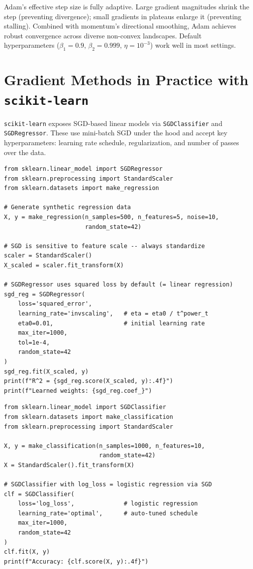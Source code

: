 \begin{remark}
Adam's effective step size is fully adaptive. Large gradient magnitudes shrink the step (preventing divergence); small gradients in plateaus enlarge it (preventing stalling). Combined with momentum's directional smoothing, Adam achieves robust convergence across diverse non-convex landscapes. Default hyperparameters ($\beta_1 = 0.9$, $\beta_2 = 0.999$, $\eta = 10^{-3}$) work well in most settings.
\end{remark}

\section*{Gradient Methods in Practice with \texttt{scikit-learn}}

\texttt{scikit-learn} exposes SGD-based linear models via \texttt{SGDClassifier} and \texttt{SGDRegressor}. These use mini-batch SGD under the hood and accept key hyperparameters: learning rate schedule, regularization, and number of passes over the data.

\begin{lstlisting}[style=pythonstyle]
from sklearn.linear_model import SGDRegressor
from sklearn.preprocessing import StandardScaler
from sklearn.datasets import make_regression

# Generate synthetic regression data
X, y = make_regression(n_samples=500, n_features=5, noise=10,
                       random_state=42)

# SGD is sensitive to feature scale -- always standardize
scaler = StandardScaler()
X_scaled = scaler.fit_transform(X)

# SGDRegressor uses squared loss by default (= linear regression)
sgd_reg = SGDRegressor(
    loss='squared_error',
    learning_rate='invscaling',   # eta = eta0 / t^power_t
    eta0=0.01,                    # initial learning rate
    max_iter=1000,
    tol=1e-4,
    random_state=42
)
sgd_reg.fit(X_scaled, y)
print(f"R^2 = {sgd_reg.score(X_scaled, y):.4f}")
print(f"Learned weights: {sgd_reg.coef_}")
\end{lstlisting}

\begin{lstlisting}[style=pythonstyle]
from sklearn.linear_model import SGDClassifier
from sklearn.datasets import make_classification
from sklearn.preprocessing import StandardScaler

X, y = make_classification(n_samples=1000, n_features=10,
                           random_state=42)
X = StandardScaler().fit_transform(X)

# SGDClassifier with log_loss = logistic regression via SGD
clf = SGDClassifier(
    loss='log_loss',              # logistic regression
    learning_rate='optimal',      # auto-tuned schedule
    max_iter=1000,
    random_state=42
)
clf.fit(X, y)
print(f"Accuracy: {clf.score(X, y):.4f}")
\end{lstlisting}

